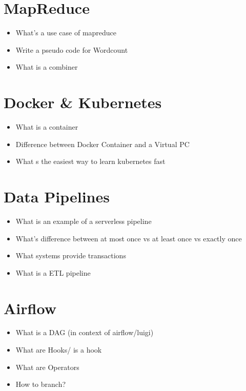 \documentclass[12pt, numbers=noenddot]{scrreprt} %
\begin{document}
\section*{MapReduce}

\begin{itemize}
\item What's a use case of mapreduce
\item Write a pseudo code for Wordcount
\item What is a combiner
\end{itemize}

\section*{Docker \& Kubernetes}

\begin{itemize}
\item What is a container
\item Difference between Docker Container and a Virtual PC
\item What s the easiest way to learn kubernetes fast
\end{itemize}

\section*{Data Pipelines}

\begin{itemize}
\item  What is an example of a serverless pipeline
\item  What's difference between at most once vs at least once vs exactly once
\item  What systems provide transactions
\item  What is a ETL pipeline
\end{itemize}

\section*{Airflow}

\begin{itemize}
\item What is a DAG (in context of airflow/luigi)
\item What are Hooks/ is a hook
\item What are Operators
\item How to branch?
\end{itemize}
\end{document}
